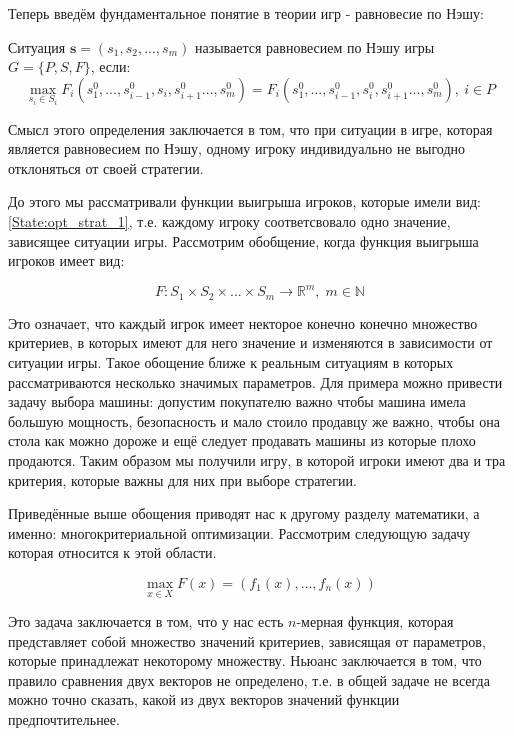 Теперь введём фундаментальное понятие в теории игр - 
равновесие по Нэшу:

\begin{Def}
	Ситуация $\textbf{s} = (s_1, s_2, ..., s_m)$ называется
	равновесием по Нэшу игры $G = \lbrace P, S, F \rbrace$, если:
	$$
		\max \limits_{s_i \in S_i} 
		F_i(s_1^0, ..., s_{i-1}^0, s_i, s_{i+1}^0..., s_m^0)=
		F_i(s_1^0, ..., s_{i-1}^0, s_i^0, s_{i+1}^0..., s_m^0),
		\: i \in P
	$$
\end{Def}

Смысл этого определения заключается в том, что 
при ситуации в игре, которая является равновесием по Нэшу,
одному игроку индивидуально не выгодно отклоняться от своей стратегии.

До этого мы рассматривали функции выигрыша игроков, которые имели вид:
\eqref{State:opt_strat_1}, т.е. каждому игроку соответсвовало одно
значение, зависящее ситуации игры. Рассмотрим обобщение, когда 
функция выигрыша игроков имеет вид:

\begin{equation}
	F: S_1 \times S_2 \times ... \times S_m \rightarrow \mathbb R^m
	, \; m \in \mathbb{N}
	\label{eq:payoff_function}
\end{equation}

Это означает, что каждый игрок имеет некторое конечно конечно множество
критериев, в которых имеют для него значение и изменяются в зависимости
от ситуации игры. Такое обощение ближе к реальным ситуациям
в которых рассматриваются несколько значимых параметров. Для примера 
можно привести задачу выбора машины: допустим покупателю важно
чтобы машина имела большую мощность, безопасность и мало стоило
продавцу же важно, чтобы она стола как можно дороже и ещё следует
продавать машины из которые плохо продаются. Таким образом мы получили
игру, в которой игроки имеют два и тра критерия, которые важны для них
при выборе стратегии.

	Приведённые выше обощения приводят нас к другому разделу
математики, а именно: многокритериальной оптимизации. Рассмотрим
следующую задачу которая относится к этой области.

\begin{equation}
	\max\limits_{x \in X} F(x)=({f}_1(x),\ldots, {f}_n(x))
	\label{eq:mc_problem}
\end{equation}

Это задача заключается в том, что у нас есть $n$-мерная функция,
которая представляет собой множество значений критериев, зависящая
от параметров, которые принадлежат некоторому множеству.
Ньюанс заключается в том, что правило сравнения двух векторов
не определено, т.е. в общей задаче не всегда можно точно сказать,
какой из двух векторов значений функции предпочтительнее.

